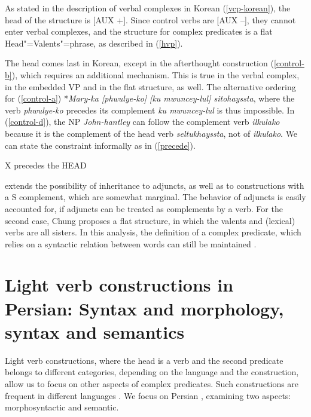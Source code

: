 \documentclass[output=paper]{langsci/langscibook}
\begin{document}
	As stated in the description of verbal complexes in Korean (\ref{vcp-korean}), the head of the structure is [AUX +]. Since control verbs are [AUX --], they cannot enter verbal complexes, and the structure for complex predicates is a flat Head"=Valents"=phrase, as described in (\ref{hvp}). 
	
	
	The head comes last in Korean, except in the afterthought construction (\ref{control-b}), which requires an additional mechanism. This is true in the verbal complex, in the embedded VP and in the flat structure, as well. The alternative ordering for (\ref{control-a}) *\textit{Mary-ka [phwulye-ko] [ku mwuncey-lul] sitohayssta}, where the verb \textit{phwulye-ko} precedes its complement \textit{ku mwuncey-lul} is thus impossible. In (\ref{control-d}), the NP \textit{John-hantley} can follow the complement verb \textit{ilkulako} because it is the complement of the head verb \textit{seltukhayssta}, not of \textit{ilkulako}.   
	We can state the constraint informally as in (\ref{precede}).
	
	\begin{exe}
		\ex \label{precede}
		X precedes the HEAD
	\end{exe}
	
	\cite{CC1998} extends the possibility of inheritance to adjuncts, as well as to constructions with a S complement, which are somewhat marginal. The behavior of adjuncts is easily accounted for, if adjuncts can be treated as complements \citep{BMS2001a-Short} by a verb. For the second case, Chung proposes a flat structure, in which the valents and (lexical) verbs are all sisters. In this analysis, the definition of a complex predicate, which relies on a syntactic relation between words can still be maintained \citep[but see][for a different proposal based on linearization]{Lee2001}.
	
	
	\section{Light verb constructions in Persian: Syntax and morphology, syntax and semantics}
	
	Light verb constructions, where the head is a verb and the second predicate belongs to different categories, depending on the language and the construction, allow us to focus on other aspects of complex predicates. Such constructions are frequent in different languages \citep[see][for noun-verb combinations in Korean]{CW2001, Lee2001}. We focus on Persian \citep{BS2010, MuellerPersian-unlinked, Samvelian2012}, examining two aspects: morphosyntactic and semantic.
	
\end{document}
